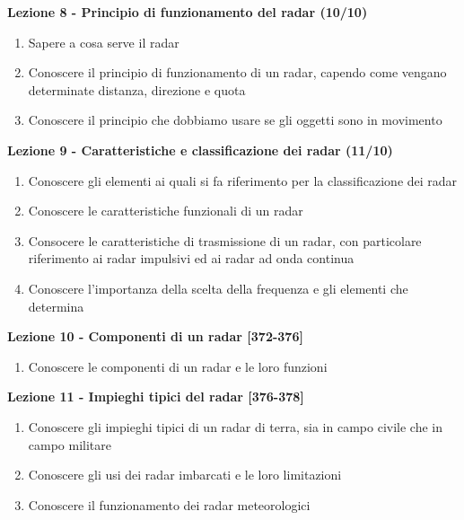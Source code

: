 \documentclass{article}
\begin{document}
	\begin{center}
	\textbf{Lezione 8 - Principio di funzionamento del radar (10/10)}
	\begin{enumerate}
	\item Sapere a cosa serve il radar
	\item Conoscere il principio di funzionamento di un radar, capendo come vengano determinate distanza, direzione e quota
	\item Conoscere il principio che dobbiamo usare se gli oggetti sono in movimento
	\end{enumerate}
	\end{center}
	
	\begin{center}
	\textbf{Lezione 9 - Caratteristiche e classificazione dei radar (11/10)}
	\begin{enumerate}
	\item Conoscere gli elementi ai quali si fa riferimento per la classificazione dei radar
	\item Conoscere le caratteristiche funzionali di un radar
	\item Consocere le caratteristiche di trasmissione di un radar, con particolare riferimento ai radar impulsivi ed ai radar ad onda continua
	\item Conoscere l'importanza della scelta della frequenza e gli elementi che determina
	\end{enumerate}
	\end{center}
	
	\begin{center}
	\textbf{Lezione 10 - Componenti di un radar [372-376]}
	\begin{enumerate}
	\item Conoscere le componenti di un radar e le loro funzioni
	\end{enumerate}
	\end{center}
	
	\begin{center}
	\textbf{Lezione 11 - Impieghi tipici del radar [376-378]}
	\begin{enumerate}
	\item Conoscere gli impieghi tipici di un radar di terra, sia in campo civile che in campo militare
	\item Conoscere gli usi dei radar imbarcati e le loro limitazioni
	\item Conoscere il funzionamento dei radar meteorologici
	\end{enumerate}
	\end{center}
	
\end{document}
